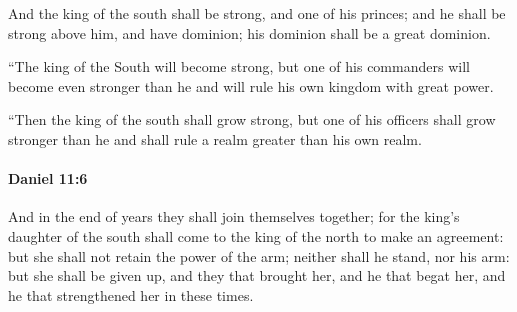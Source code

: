 			\begin{versebox}
					\item[BHS] 
					\item[LXX] 
					\item[ASV] And the king of the south shall be strong, and one of his princes; and he shall be strong above him, and have dominion; his dominion shall be a great dominion.
					\item[NIV] “The king of the South will become strong, but one of his commanders will become even stronger than he and will rule his own kingdom with great power.
					\item[NRSV] “Then the king of the south shall grow strong, but one of his officers shall grow stronger than he and shall rule a realm greater than his own realm.
			\end{versebox}

		\paragraph{Daniel 11:6} %
			\label{DANIEL-11-6}

			And in the end of years they shall join themselves together; for the king’s daughter of the south shall come to the king of the north to make an agreement: but she shall not retain the power of the arm; neither shall he stand, nor his arm: but she shall be given up, and they that brought her, and he that begat her, and he that strengthened her in these times.

